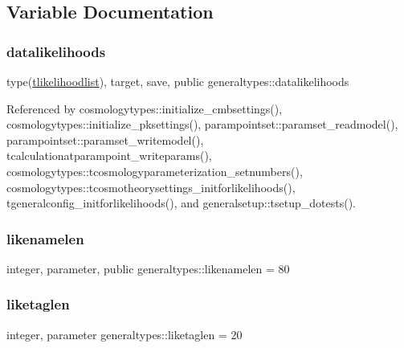 \subsection{Variable Documentation}
\mbox{\label{namespacegeneraltypes_a2e2a79dda657e0a8910f724be0015ed5}} 
\subsubsection{\texorpdfstring{datalikelihoods}{datalikelihoods}}
{\footnotesize\ttfamily type(\mbox{\hyperlink{structgeneraltypes_1_1tlikelihoodlist}{tlikelihoodlist}}), target, save, public generaltypes\+::datalikelihoods}



Referenced by cosmologytypes\+::initialize\+\_\+cmbsettings(), cosmologytypes\+::initialize\+\_\+pksettings(), parampointset\+::paramset\+\_\+readmodel(), parampointset\+::paramset\+\_\+writemodel(), tcalculationatparampoint\+\_\+writeparams(), cosmologytypes\+::tcosmologyparameterization\+\_\+setnumbers(), cosmologytypes\+::tcosmotheorysettings\+\_\+initforlikelihoods(), tgeneralconfig\+\_\+initforlikelihoods(), and generalsetup\+::tsetup\+\_\+dotests().

\mbox{\label{namespacegeneraltypes_ace8a6f4c868858b72f97b45b87312845}} 
\subsubsection{\texorpdfstring{likenamelen}{likenamelen}}
{\footnotesize\ttfamily integer, parameter, public generaltypes\+::likenamelen = 80}

\mbox{\label{namespacegeneraltypes_aa0157fd48eed0fc43695836a0c19e1f0}} 
\subsubsection{\texorpdfstring{liketaglen}{liketaglen}}
{\footnotesize\ttfamily integer, parameter generaltypes\+::liketaglen = 20\hspace{0.3cm}{\ttfamily [private]}}

